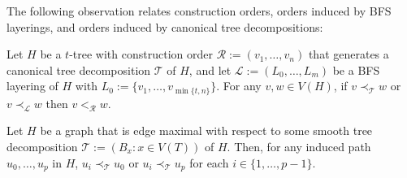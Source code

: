 \documentclass[kpfonts]{patmorin}
\theoremstyle{named}
\begin{document}
The following observation relates construction orders, orders induced by BFS layerings, and orders induced by canonical tree decompositions:

\begin{obs}\label{order-relation}
    Let $H$ be a $t$-tree with construction order $\mathcal{R}:=(v_1,\ldots,v_n)$ that generates a canonical tree decomposition $\mathcal{T}$ of $H$, and let $\mathcal{L}:=(L_0,\ldots,L_m)$ be a BFS layering of $H$ with $L_0:=\{v_1,\ldots,v_{\min\{t,n\}}\}$.  For any $v,w\in V(H)$,
    if $v\prec_{\mathcal{T}} w$ or $v\prec_{\mathcal{L}} w$ then $v<_{\mathcal{R}} w$.
\end{obs}

\begin{obs}\label{induced-unimodal}
    Let $H$ be a graph that is edge maximal with respect to some smooth tree decomposition $\mathcal{T}:=(B_x:x\in V(T))$ of $H$.  Then, for any induced path $u_0,\ldots,u_p$ in $H$, $u_i\prec_\mathcal{T} u_0$ or $u_i\prec_\mathcal{T} u_p$ for each $i\in\{1,\ldots,p-1\}$.
\end{obs}
\end{document}

